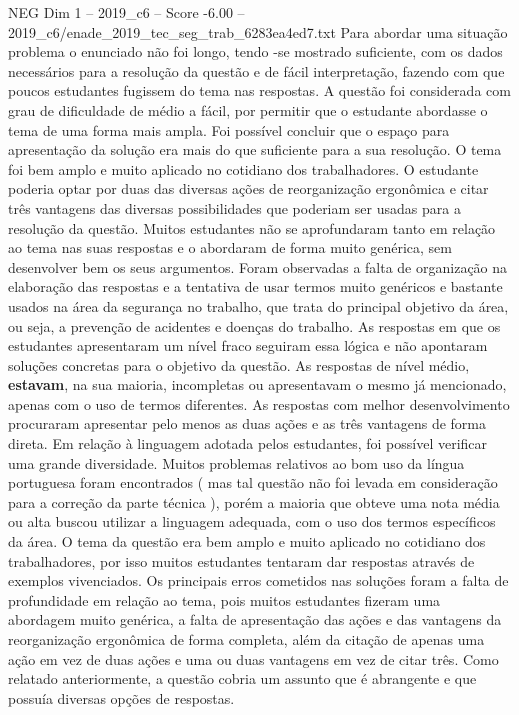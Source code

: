 \begin{textsample}{NEG Dim 1 – 2019\_c6 – Score -6.00 – 2019\_c6/enade\_2019\_tec\_seg\_trab\_6283ea4ed7.txt}
Para abordar uma situação problema o enunciado não foi longo, tendo -se mostrado suficiente, com os dados necessários para a resolução da questão e de fácil interpretação, fazendo com que poucos estudantes fugissem do tema nas respostas.
A questão foi considerada com grau de dificuldade de médio a fácil, por permitir que o estudante abordasse o tema de uma forma mais ampla.
Foi possível concluir que o espaço para apresentação da solução era mais do que suficiente para a sua resolução.
O tema foi bem amplo e muito aplicado no cotidiano dos trabalhadores.
O estudante poderia optar por duas das diversas ações de reorganização ergonômica e citar três vantagens das diversas possibilidades que poderiam ser usadas para a resolução da questão.
Muitos estudantes não se aprofundaram tanto em relação ao tema nas suas respostas e o abordaram de forma muito genérica, sem desenvolver bem os seus argumentos.
Foram observadas a falta de organização na elaboração das respostas e a tentativa de usar termos muito genéricos e bastante usados na área da segurança no trabalho, que trata do principal objetivo da área, ou seja, a prevenção de acidentes e doenças do trabalho.
As respostas em que os estudantes apresentaram um nível fraco seguiram essa lógica e não apontaram soluções concretas para o objetivo da questão.
As respostas de nível médio, \textbf{estavam}, na sua maioria, incompletas ou apresentavam o mesmo já mencionado, apenas com o uso de termos diferentes.
As respostas com melhor desenvolvimento procuraram apresentar pelo menos as duas ações e as três vantagens de forma direta.
Em relação à linguagem adotada pelos estudantes, foi possível verificar uma grande diversidade.
Muitos problemas relativos ao bom uso da língua portuguesa foram encontrados ( mas tal questão não foi levada em consideração para a correção da parte técnica ), porém a maioria que obteve uma nota média ou alta buscou utilizar a linguagem adequada, com o uso dos termos específicos da área.
O tema da questão era bem amplo e muito aplicado no cotidiano dos trabalhadores, por isso muitos estudantes tentaram dar respostas através de exemplos vivenciados.
Os principais erros cometidos nas soluções foram a falta de profundidade em relação ao tema, pois muitos estudantes fizeram uma abordagem muito genérica, a falta de apresentação das ações e das vantagens da reorganização ergonômica de forma completa, além da citação de apenas uma ação em vez de duas ações e uma ou duas vantagens em vez de citar três.
Como relatado anteriormente, a questão cobria um assunto que é abrangente e que possuía diversas opções de respostas.

\end{textsample}
